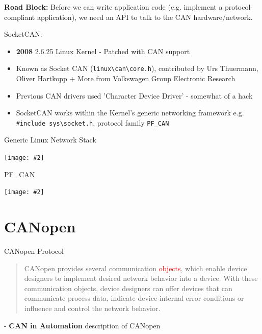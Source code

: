 \documentclass{beamer}
\newcommand {\framedgraphic}[2] {
    \begin{frame}{#1}
        \begin{center}
            \texttt{[image: \#2]}
        \end{center}
    \end{frame}
}
\begin{document}
     \begin{frame}
       \textbf{Road Block:} Before we can write application code (e.g. implement a protocol-compliant application), we need an API to talk to the CAN hardware/network.\pause

       
     \end{frame}

     \begin{frame}
       SocketCAN:
       \begin{itemize}
       \item{\textbf{2008} 2.6.25 Linux Kernel - Patched with CAN support}\pause
       \item{Known as Socket CAN (\texttt{linux\textbackslash can\textbackslash core.h}), contributed by Urs Thuermann, Oliver Hartkopp + More from Volkswagen Group Electronic Research}\pause
         \item{Previous CAN drivers used 'Character Device Driver' - somewhat of a hack}\pause
         \item{SocketCAN works within the Kernel's generic networking framework e.g. \texttt{\#include sys\textbackslash socket.h}, protocol family \texttt{PF\_CAN}}
       \end{itemize}         
     \end{frame}

     \framedgraphic{Generic Linux Network Stack}{./images/linux_network_generic}
     \framedgraphic{PF\_CAN}{./images/linux_network_CAN}

\section{CANopen}
     
     \begin{frame}{CANopen Protocol}
       \begin{quotation}
         CANopen provides several communication \textcolor{red}{objects}, which enable device designers to implement desired network behavior into a device. With these communication objects, device designers can offer devices that can communicate process data, indicate device-internal error conditions or influence and control the network behavior.
         \end{quotation}
       \raggedright{- \textbf{CAN in Automation} description of CANopen}
       \end{frame}
\end{document}
